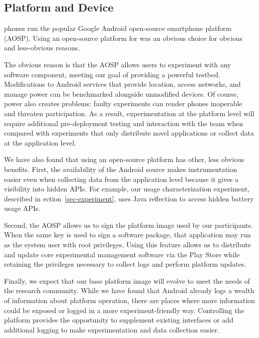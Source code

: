 \subsection{Platform and Device}

\PhoneLab{} phones run the popular Google Android open-source smartphone
platform (AOSP). Using an open-source platform for \PhoneLab{} was an obvious
choice for obvious and less-obvious reasons.

The obvious reason is that the AOSP allows \PhoneLab{} users to experiment
with any software component, meeting our goal of providing a powerful
testbed. Modifications to Android services that provide location, access
networks, and manage power can be benchmarked alongside unmodified devices.
Of course, power also creates problems: faulty experiments can render phones
inoperable and threaten participation. As a result, experimentation at the
platform level will require additional pre-deployment testing and interaction
with the \PhoneLab{} team when compared with experiments that only distribute
novel applications or collect data at the application level.

We have also found that using an open-source platform has other, less obvious
benefits. First, the availability of the Android source makes \PhoneLab{}
instrumentation easier even when collecting data from the application level
because it gives a visibility into hidden APIs. For example, our usage
characterization experiment, described in ection~\ref{sec-experiment}, uses Java
reflection to access hidden battery usage APIs.

Second, the AOSP allows us to sign the platform image used by our
participants. When the same key is used to sign a software package, that
application may run as the system user with root privileges. Using this
feature allows us to distribute and update core \PhoneLab{} experimental
management software via the Play Store while retaining the privileges necessary
to collect logs and perform platform updates.

Finally, we expect that our base \PhoneLab{} platform image will evolve to
meet the needs of the research community. While we have found that Android
already logs a wealth of information about platform operation, there are
places where more information could be exposed or logged in a more
experiment-friendly way. Controlling the platform provides the opportunity to
supplement existing interfaces or add additional logging to make
experimentation and data collection easier.

